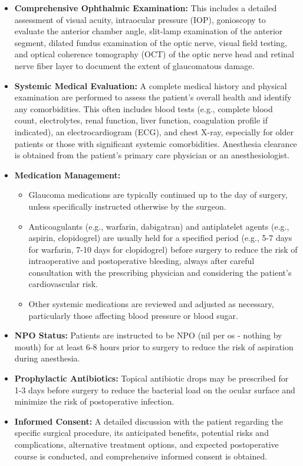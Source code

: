 \begin{itemize}
  \item \textbf{Comprehensive Ophthalmic Examination:} This includes a detailed assessment of visual acuity, intraocular pressure (IOP), gonioscopy to evaluate the anterior chamber angle, slit-lamp examination of the anterior segment, dilated fundus examination of the optic nerve, visual field testing, and optical coherence tomography (OCT) of the optic nerve head and retinal nerve fiber layer to document the extent of glaucomatous damage.
  \item \textbf{Systemic Medical Evaluation:} A complete medical history and physical examination are performed to assess the patient's overall health and identify any comorbidities. This often includes blood tests (e.g., complete blood count, electrolytes, renal function, liver function, coagulation profile if indicated), an electrocardiogram (ECG), and chest X-ray, especially for older patients or those with significant systemic comorbidities. Anesthesia clearance is obtained from the patient's primary care physician or an anesthesiologist.
  \item \textbf{Medication Management:}
    \begin{itemize}
      \item Glaucoma medications are typically continued up to the day of surgery, unless specifically instructed otherwise by the surgeon.
      \item Anticoagulants (e.g., warfarin, dabigatran) and antiplatelet agents (e.g., aspirin, clopidogrel) are usually held for a specified period (e.g., 5-7 days for warfarin, 7-10 days for clopidogrel) before surgery to reduce the risk of intraoperative and postoperative bleeding, always after careful consultation with the prescribing physician and considering the patient's cardiovascular risk.
      \item Other systemic medications are reviewed and adjusted as necessary, particularly those affecting blood pressure or blood sugar.
    \end{itemize}
  \item \textbf{NPO Status:} Patients are instructed to be NPO (nil per os - nothing by mouth) for at least 6-8 hours prior to surgery to reduce the risk of aspiration during anesthesia.
  \item \textbf{Prophylactic Antibiotics:} Topical antibiotic drops may be prescribed for 1-3 days before surgery to reduce the bacterial load on the ocular surface and minimize the risk of postoperative infection.
  \item \textbf{Informed Consent:} A detailed discussion with the patient regarding the specific surgical procedure, its anticipated benefits, potential risks and complications, alternative treatment options, and expected postoperative course is conducted, and comprehensive informed consent is obtained.
\end{itemize}

